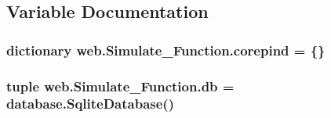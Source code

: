 \subsection{Variable Documentation}
\hypertarget{namespaceweb_1_1_simulate___function_a81c5f255dec55bf662a9efb5d21ed85d}{
\subsubsection[{corepind}]{\setlength{\rightskip}{0pt plus 5cm}dictionary web.\-Simulate\-\_\-\-Function.\-corepind = \{\}}}\label{namespaceweb_1_1_simulate___function_a81c5f255dec55bf662a9efb5d21ed85d}
\hypertarget{namespaceweb_1_1_simulate___function_aa6287cbf61a8af0085b4f12a1dd76ea4}{
\subsubsection[{db}]{\setlength{\rightskip}{0pt plus 5cm}tuple web.\-Simulate\-\_\-\-Function.\-db = {\bf database.\-Sqlite\-Database}()}}\label{namespaceweb_1_1_simulate___function_aa6287cbf61a8af0085b4f12a1dd76ea4}
